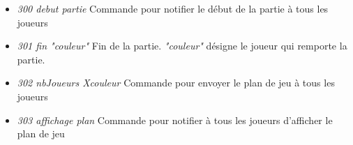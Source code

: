 \par

\begin{itemize}

 \item \textit{300 debut partie}			\tabto{4cm} Commande pour notifier le début de la partie à tous les joueurs
 
 \item \textit{301 fin "couleur"}			\tabto{4cm} Fin de la partie. \textit{"couleur"} désigne le joueur qui remporte la partie. 

 \item \textit{302 nbJoueurs {Xcouleur}}	\tabto{4cm} Commande pour envoyer le plan de jeu à tous les joueurs 

 \item \textit{303 affichage plan} 			\tabto{4cm} Commande pour notifier à tous les joueurs d'afficher le plan de jeu \\
 
\end{itemize} 